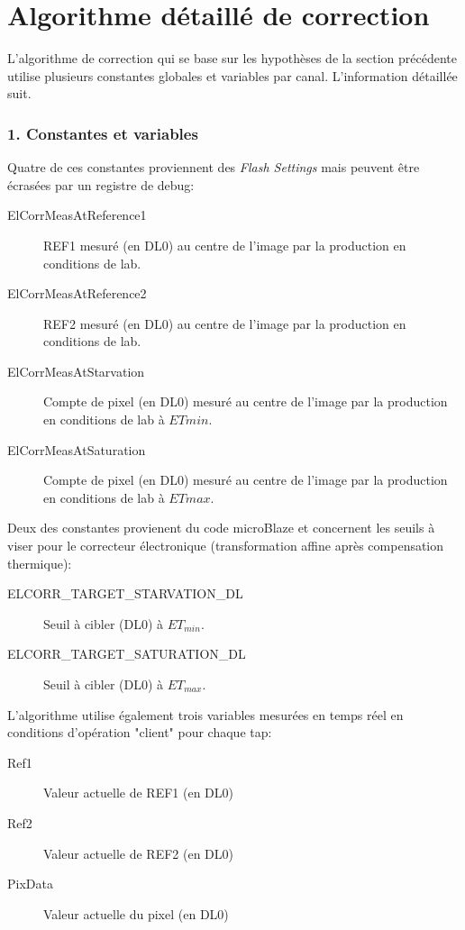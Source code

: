 \documentclass[11pt]{report}
\begin{document}
\section{Algorithme détaillé de correction}
L'algorithme de correction qui se base sur les hypothèses de la section précédente utilise plusieurs constantes globales et variables par canal. L'information détaillée suit.

\subsubsection{1. Constantes et variables}
Quatre de ces constantes proviennent des \emph{Flash Settings} mais peuvent être écrasées par un registre de debug:
\begin{description}
\item[ElCorrMeasAtReference1] REF1 mesuré (en DL0) au centre de l'image par la production en conditions de lab.
\item[ElCorrMeasAtReference2] REF2 mesuré (en DL0) au centre de l'image par la production en conditions de lab.
\item[ElCorrMeasAtStarvation] Compte de pixel (en DL0) mesuré au centre de l'image par la production en conditions de lab à $ETmin$.
\item[ElCorrMeasAtSaturation] Compte de pixel (en DL0) mesuré au centre de l'image par la production en conditions de lab à $ETmax$.
\end{description}

Deux des constantes provienent du code microBlaze et concernent les seuils à viser pour le correcteur électronique (transformation affine après compensation thermique):
\begin{description}
\item[ELCORR\_TARGET\_STARVATION\_DL] Seuil à cibler (DL0) à $ET_{min}$.
\item[ELCORR\_TARGET\_SATURATION\_DL] Seuil à cibler (DL0) à $ET_{max}$.
\end{description}

L'algorithme utilise également trois variables mesurées en temps réel en conditions d'opération "client" pour chaque tap:
\begin{description}
\item[Ref1] Valeur actuelle de REF1 (en DL0)
\item[Ref2] Valeur actuelle de REF2 (en DL0)
\item[PixData] Valeur actuelle du pixel (en DL0)
\end{description}
\end{document}
